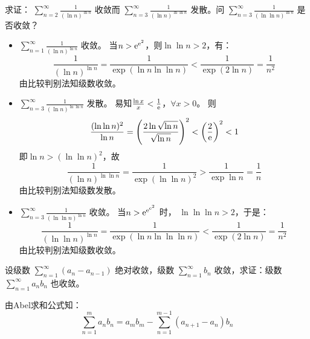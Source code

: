 \begin{problem}
    求证： \(\sum_{n=2}^{\infty} \frac{1}{(\ln n)^{\ln n}}\) 收敛而
    \(\sum_{n=3}^{\infty} \frac{1}{(\ln n)^{\ln \ln n}}\) 发散。问
    \(\sum_{n=3}^{\infty} \frac{1}{(\ln \ln n)^{\ln n}}\) 是否收敛？
\end{problem}

\begin{solution}
    \begin{itemize}
        \item \(\sum_{n=1}^{\infty} \frac{1}{(\ln n)^{\ln n}}\) 收敛。
            当\(n > \mathrm{e}^{\mathrm{e}^{2}}\)，则\(\ln \ln n > 2\)，有：
            \[
                \frac{1}{(\ln n)^{\ln n}} = \frac{1}{\exp(\ln n
                \ln\ln n)} < \frac{1}{\exp(2\ln n)} = \frac{1}{n^2}
            \]
            由比较判别法知级数收敛。
        \item \(\sum_{n=3}^{\infty} \frac{1}{(\ln n)^{\ln
            \ln n}}\) 发散。
            易知\(\frac{\ln x}{x} < \frac{1}{\mathrm{e}}\)，\(\forall x > 0\)。
            则\[
                \frac{(\ln\ln n)^{2}}{\ln n} = \left( \frac{2\ln
                \sqrt{\ln n}}{\sqrt{\ln n}} \right)^{2} < \left(
                \frac{2}{\mathrm{e}} \right)^{2} < 1
            \]
            即\(\ln n > (\ln \ln n)^{2}\)，故\[
                \frac{1}{(\ln n)^{\ln \ln n}} = \frac{1}{\exp(\ln\ln
                n)^{2}} > \frac{1}{\exp \ln n} = \frac{1}{n}
            \]
            由比较判别法知级数发散。
        \item \(\sum_{n=3}^{\infty} \frac{1}{(\ln \ln
            n)^{\ln n}}\) 收敛。
            当\(n > \mathrm{e}^{\mathrm{e}^{\mathrm{e}^{2}}}\) 时，
            \(\ln\ln\ln n > 2\)，于是： \[
                \frac{1}{(\ln \ln n)^{\ln n}} = \frac{1}{\exp(\ln n
                \ln\ln\ln n)} < \frac{1}{\exp(2\ln n)} = \frac{1}{n^2}
            \]
            由比较判别法知级数收敛。
    \end{itemize}
\end{solution}
\setcounter{problems}{11}
\begin{problem}
    设级数 \(\sum_{n=1}^{\infty} (a_n - a_{n-1})\) 绝对收敛，级数
    \(\sum_{n=1}^{\infty} b_n\) 收敛，求证：级数
    \(\sum_{n=1}^{\infty} a_n b_n\) 也收敛。
\end{problem}

\begin{solution}
    由Abel求和公式知： \[
        \sum_{n=1}^{m} a_{n}b_{n} = a_{m}b_{m} - \sum_{n=1}^{m-1}
        (a_{n+1} - a_{n})b_{n}
    \]

\end{solution}
